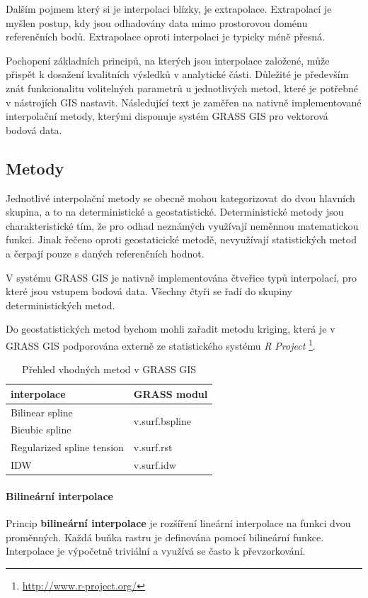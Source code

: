 \documentclass[a4paper,12pt]{report}
\begin{document}
Dalším pojmem který si je interpolaci blízky, je extrapolace. Extrapolací je myšlen postup, kdy jsou odhadovány data mimo prostorovou doménu referenčních bodů. Extrapolace oproti interpolaci je  typicky méně přesná.

Pochopení základních  principů, na  kterých jsou interpolace založené, může přispět k dosažení kvalitních výsledků v analytické části. Důležité je především znát funkcionalitu volitelných parametrů u jednotlivých metod, které je potřebné v nástrojích GIS nastavit. Následující text je zaměřen na nativně implementované interpolační metody, kterými disponuje systém GRASS GIS pro vektorová bodová data. 


\subsection{Metody}
Jednotlivé interpolační metody se obecně mohou kategorizovat do dvou hlavních skupina, a to na deterministické a geostatistické. 
Deterministické metody jsou charakteristické tím, že pro odhad neznámých využívají neměnnou matematickou funkci. Jinak řečeno oproti geostaticické metodě, nevyužívají statistických metod a čerpají pouze s daných referenčních hodnot.

V systému GRASS GIS je nativně implementována  čtveřice typů interpolací, pro které jsou vstupem  bodová data. Všechny čtyři se řadí do skupiny deterministických metod.

Do geostatistických metod bychom mohli zařadit metodu kriging, která je v GRASS GIS podporována externě ze statistického systému \textit{R Project} \footnote{\url{http://www.r-project.org/}}.



\begin{table}[h]
\centering
\begin{tabular}{|ll|}
\hline
interpolace & GRASS modul \\ \hline\hline
Bilinear spline & \multirow{2}{*}{v.surf.bspline} \\
Bicubic spline &  \\
Regularized spline tension & v.surf.rst \\
IDW & v.surf.idw \\ \hline
\end{tabular}
\caption{Přehled vhodných metod v GRASS GIS}
\label{my-label}
\end{table}


\paragraph{Bilineární interpolace} Princip \textbf{bilineární interpolace} je  rozšíření lineární interpolace na funkci dvou proměnných. Každá buňka rastru je definována pomocí bilineární funkce. Interpolace je výpočetně triviální a využívá se často k převzorkování.
\end{document}
